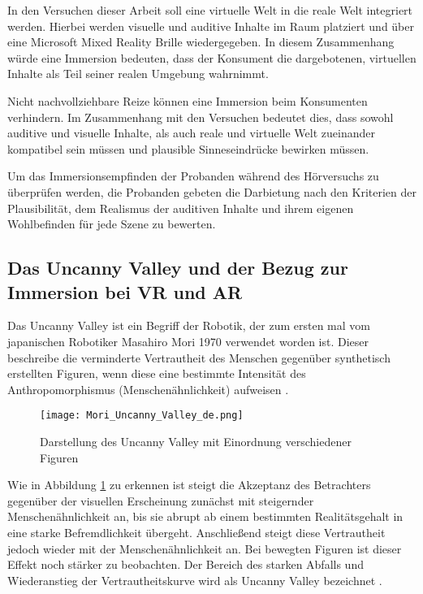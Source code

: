In den Versuchen dieser Arbeit soll eine virtuelle Welt in die reale Welt integriert werden. Hierbei werden visuelle und auditive Inhalte im Raum platziert und über eine Microsoft Mixed Reality Brille wiedergegeben. In diesem Zusammenhang würde eine Immersion bedeuten, dass der Konsument die dargebotenen, virtuellen Inhalte  als Teil seiner realen Umgebung wahrnimmt. 
 
 Nicht nachvollziehbare Reize können eine Immersion beim Konsumenten verhindern\cite[S.17]{Grau03}. Im Zusammenhang mit den Versuchen bedeutet dies, dass sowohl auditive und visuelle Inhalte, als auch reale und virtuelle Welt zueinander kompatibel sein müssen und plausible Sinneseindrücke bewirken müssen. 
 
 Um das Immersionsempfinden der Probanden während des Hörversuchs zu überprüfen werden, die Probanden gebeten die Darbietung nach den Kriterien der Plausibilität, dem Realismus der auditiven Inhalte und ihrem eigenen Wohlbefinden für jede Szene zu bewerten.
 
\subsection{Das Uncanny Valley und der Bezug zur Immersion bei VR und AR}

Das Uncanny Valley ist ein Begriff der Robotik, der zum ersten mal vom japanischen Robotiker Masahiro Mori 1970 verwendet worden ist. Dieser beschreibe die verminderte Vertrautheit des Menschen gegenüber synthetisch erstellten Figuren, wenn diese eine bestimmte Intensität des Anthropomorphismus (Menschenähnlichkeit) aufweisen \cite{Mori70}.

\begin{figure}[H]
\centering
\texttt{[image: Mori\_Uncanny\_Valley\_de.png]}
\caption{Darstellung des Uncanny Valley mit Einordnung verschiedener Figuren} 
\label{fig:Mori_Uncynn_Valley_de}
\end{figure}

Wie in Abbildung \ref{fig:Mori_Uncynn_Valley_de} zu erkennen ist steigt die Akzeptanz des Betrachters gegenüber der visuellen Erscheinung zunächst mit steigernder Menschenähnlichkeit an, bis sie abrupt ab einem bestimmten Realitätsgehalt in eine starke Befremdlichkeit übergeht. Anschließend steigt diese Vertrautheit jedoch wieder mit der Menschenähnlichkeit an. Bei bewegten Figuren ist dieser Effekt noch stärker zu beobachten. Der Bereich des starken Abfalls und Wiederanstieg der Vertrautheitskurve wird als Uncanny Valley bezeichnet \cite{Mori70}.\\

